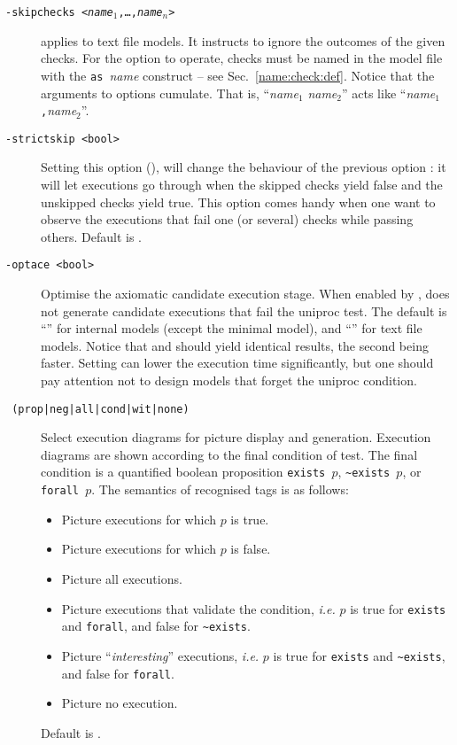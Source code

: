 \begin{description}
\item[{\tt -skipchecks <\textit{name}$_1$,\ldots,\textit{name}$_n$>}]
applies to text file models. It instructs \herd{} to ignore
the outcomes of the given checks. For the option to operate, checks must
be named in the model file with the \texttt{as }\textit{name} construct --
see Sec.~\ref{name:check:def}.
Notice that the arguments to  options cumulate.
That is, ``\textit{name}$_1$ \textit{name}$_2$'' acts like ``\textit{name}$_1$\texttt{,}\textit{name}$_2$''. 

\item [{\tt -strictskip <bool>}] Setting this option (),
will change the behaviour of the previous option :
it will let executions go through when the skipped checks yield
false and the unskipped checks yield true. This option comes handy
when one want to observe the executions that fail one (or several) checks
while passing others. Default is .

\item[{\tt -optace <bool>}] Optimise the axiomatic candidate execution stage.
When enabled by ,  \herd{} does not generate candidate
executions that fail the uniproc test. The default is ``''
for internal models (except the minimal model), and ``'' for
text file models. Notice that 
and  should yield identical results,
the second being faster.
Setting  can lower the execution time significantly,
but one should pay attention not to design models that forget the uniproc
condition.

\item[{\tt {} (prop|neg|all|cond|wit|none)}]
Select execution diagrams for picture display and generation.
Execution diagrams are shown according to
the final condition of test. The final condition is a quantified boolean
proposition \verb+exists +$p$, \verb+~exists +$p$, or \verb+forall +$p$.
The semantics of recognised tags is as follows:
\begin{itemize}
\item {} Picture executions for which $p$ is true.
\item {} Picture executions for which $p$ is false.
\item {}  Picture all executions.
\item {} Picture executions that validate  the condition,
\emph{i.e.} $p$ is true for \verb+exists+ and \verb+forall+, and false
for \verb+~exists+.
\item {} Picture ``\emph{interesting}'' executions,
\emph{i.e.} $p$ is true for \verb+exists+ and \verb+~exists+,
and false for \verb+forall+.
\item {} Picture no  execution.
\end{itemize}
Default is .


\end{description}
